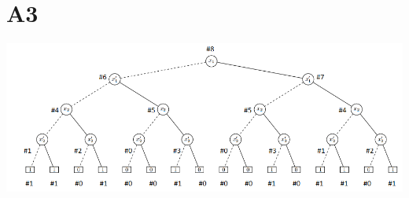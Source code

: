 \documentclass[12pt]{article}
\begin{document}
\section*{A3}
\begin{center}
\includegraphics[scale=0.75]{6}
\end{center}
\end{document}

